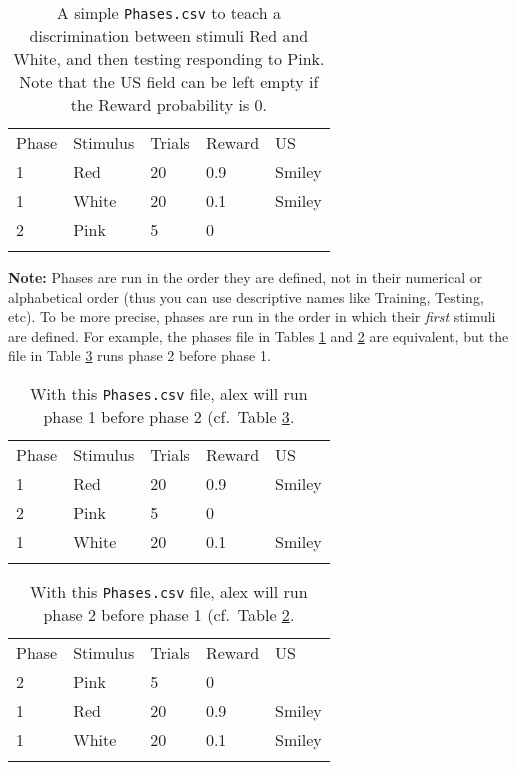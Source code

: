 \documentclass[11pt,]{article}
\renewcommand{\medskip}{}
\begin{document}
\begin{longtable}[c]{@{}lllll@{}}
\hline\noalign{\medskip}
Phase & Stimulus & Trials & Reward & US
\\\noalign{\medskip}
\hline\noalign{\medskip}
1 & Red & 20 & 0.9 & Smiley
\\\noalign{\medskip}
1 & White & 20 & 0.1 & Smiley
\\\noalign{\medskip}
2 & Pink & 5 & 0 &
\\\noalign{\medskip}
\hline
\noalign{\medskip}
\caption{A simple \texttt{Phases.csv} to teach a discrimination between
stimuli Red and White, and then testing responding to Pink. Note that
the US field can be left empty if the Reward probability is 0.
\label{phases}}
\end{longtable}

\textbf{Note:} Phases are run in the order they are defined, not in
their numerical or alphabetical order (thus you can use descriptive
names like Training, Testing, etc). To be more precise, phases are run
in the order in which their \emph{first} stimuli are defined. For
example, the phases file in Tables \ref{phases} and \ref{phases-order1}
are equivalent, but the file in Table \ref{phases-order2} runs phase 2
before phase 1.

\begin{longtable}[c]{@{}lllll@{}}
\hline\noalign{\medskip}
Phase & Stimulus & Trials & Reward & US
\\\noalign{\medskip}
\hline\noalign{\medskip}
1 & Red & 20 & 0.9 & Smiley
\\\noalign{\medskip}
2 & Pink & 5 & 0 &
\\\noalign{\medskip}
1 & White & 20 & 0.1 & Smiley
\\\noalign{\medskip}
\hline
\noalign{\medskip}
\caption{With this \texttt{Phases.csv} file, alex will run phase 1
before phase 2 (cf.~Table \ref{phases-order2}. \label{phases-order1}}
\end{longtable}

\begin{longtable}[c]{@{}lllll@{}}
\hline\noalign{\medskip}
Phase & Stimulus & Trials & Reward & US
\\\noalign{\medskip}
\hline\noalign{\medskip}
2 & Pink & 5 & 0 &
\\\noalign{\medskip}
1 & Red & 20 & 0.9 & Smiley
\\\noalign{\medskip}
1 & White & 20 & 0.1 & Smiley
\\\noalign{\medskip}
\hline
\noalign{\medskip}
\caption{With this \texttt{Phases.csv} file, alex will run phase 2
before phase 1 (cf.~Table \ref{phases-order1}. \label{phases-order2}}
\end{longtable}
\end{document}

